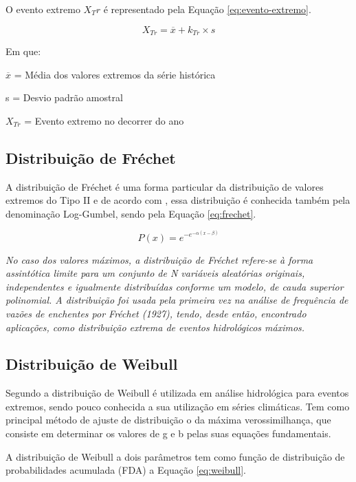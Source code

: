 O evento extremo $X_Tr$ é representado pela Equação \ref{eq:evento-extremo}.

\begin{equation}
\label{eq:evento-extremo}
    X_{Tr} = \overline{x} + k_{Tr} \times s
\end{equation}

Em que:

$\overline{x}$ = Média dos valores extremos da série histórica

s = Desvio padrão amostral

$X_{Tr}$ = Evento extremo no decorrer do ano

\subsection{Distribuição de Fréchet}

A distribuição de Fréchet é uma forma particular da distribuição de valores extremos do Tipo II e de acordo com , essa distribuição é conhecida também pela denominação Log-Gumbel, sendo pela Equação \ref{eq:frechet}.

\begin{equation}
\label{eq:frechet}
    P(x) = e^{-e^{-\alpha(x-\beta)}}
\end{equation}

\textit{No caso dos valores máximos, a distribuição de Fréchet refere-se à forma assintótica limite para um conjunto de N variáveis aleatórias originais, independentes e igualmente distribuídas conforme um modelo, de cauda superior polinomial. A distribuição foi usada pela primeira vez na análise de frequência de vazões de enchentes por Fréchet (1927), tendo, desde então, encontrado aplicações, como distribuição extrema de eventos hidrológicos máximos.}

\subsection{Distribuição de Weibull}

Segundo  a distribuição de Weibull é utilizada em análise hidrológica para eventos extremos, sendo pouco conhecida a sua utilização em séries climáticas. Tem como principal método de ajuste de distribuição o da máxima verossimilhança, que consiste em determinar os valores de g e b pelas suas equações fundamentais.

A distribuição de Weibull a dois parâmetros tem como função de distribuição de probabilidades acumulada (FDA) a Equação \ref{eq:weibull}.

